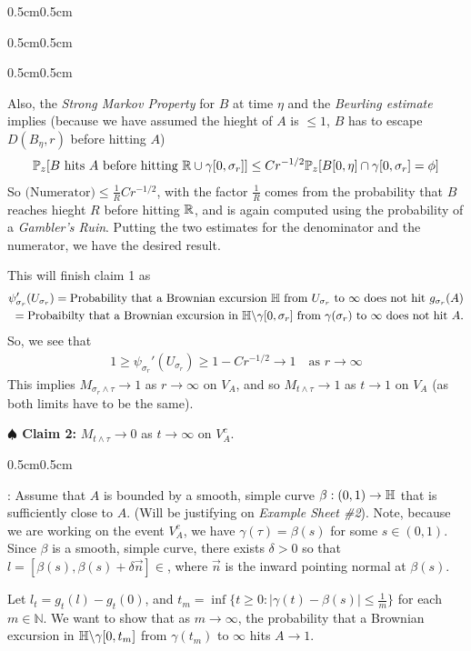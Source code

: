 \documentclass[12pt,a4paper]{article}
\newenvironment{proof}
{\begin{changemargin}{0.5cm}{0.5cm} 
	}%
	{\end{changemargin}
}
\newenvironment{subproof}
{\begin{changemargin}{0.5cm}{0.5cm} 
	}%
	{\end{changemargin}
}
\newenvironment{p}
{\begin{proof} 
	}%
	{\end{proof}
}
\begin{document}
\begin{p}
\begin{subproof}
\begin{subproof}
Also, the \emph{Strong Markov Property} for $B$ at time $\eta$ and the \emph{Beurling estimate} implies (because we have assumed the hieght of $A$ is $\leq 1$, $B$ has to escape $D(B_{\eta}, r)$ before hitting $A$)
\begin{align*}
\mathbb{P}_z [B\text{ hits }A\text{ before hitting } \mathbb{R}\cup \gamma[0, \sigma_r]] \leq C r^{-1/2} \mathbb{P}_z [B[0, \eta] \cap \gamma [0, \sigma_r] = \phi]
\end{align*}
So $\text{(Numerator)} \leq \frac{1}{R} Cr^{-1/2}$, with the factor $\frac{1}{R}$ comes from the probability that $B$ reaches hieght $R$ before hitting $\mathbb{R}$, and is again computed using the probability of a \emph{Gambler's Ruin}. Putting the two estimates for the denominator and the numerator, we have the desired result.
\end{subproof}
This will finish claim 1 as 
\begin{align*}
\psi'_{\sigma_r} (U_{\sigma_r}) = \text{Probability that a Brownian excursion }\mathbb{H}\text{ from }U_{\sigma_r}\text{ to }\infty\text{ does not hit }g_{\sigma_r}(A)\\
=\text{Probaibilty that a Brownian excursion in }\mathbb{H} \backslash \gamma [0, \sigma_r]\text{ from }\gamma(\sigma_r)\text{ to }\infty\text{ does not hit }A. 
\end{align*}
So, we see that
\begin{align*}
1\geq \psi_{\sigma_r}'(U_{\sigma_r}) \geq 1- Cr^{-1/2} \rightarrow 1 \quad \text{as } r\rightarrow \infty
\end{align*}
This implies $M_{\sigma_r \wedge \tau} \rightarrow 1$ as $r \rightarrow \infty$ on $V_A$, and so $M_{t\wedge \tau} \rightarrow 1$ as $t \rightarrow 1$ on $V_A$ (as both limits have to be the same).   
\end{subproof}
\textbf{$\spadesuit$ Claim 2:} $M_{t\wedge \tau} \rightarrow 0$ as $t\rightarrow \infty$ on $V_A^c$.
\begin{subproof}
: Assume that $A$ is bounded by a smooth, simple curve $\beta : (0, 1) \rightarrow \mathbb{H}$ that is sufficiently close to $A$. (Will be justifying on \emph{Example Sheet \#2}). Note, because we are working on the event $V_A^c$, we have $\gamma(\tau) = \beta(s)$ for some $s\in (0,1)$. Since $\beta$ is a smooth, simple curve, there exists $\delta >0$ so that $l = [\beta(s), \beta(s) + \delta \vec{n}]\in $, where $\vec{n}$ is the inward pointing normal at $\beta(s)$.

\quad Let $l_t =g_t(l) -g_t(0)$, and $t_m = \inf\{t\geq 0 : |\gamma(t) -\beta(s)| \leq \frac{1}{m} \}$ for each $m\in \mathbb{N}$. We want to show that as $m\rightarrow \infty$, the probability that a Brownian excursion in $\mathbb{H} \backslash \gamma [0, t_m]$ from $\gamma(t_m)$ to $\infty$ hits $A \rightarrow 1$.


\end{subproof}
\end{p}
\end{document}

